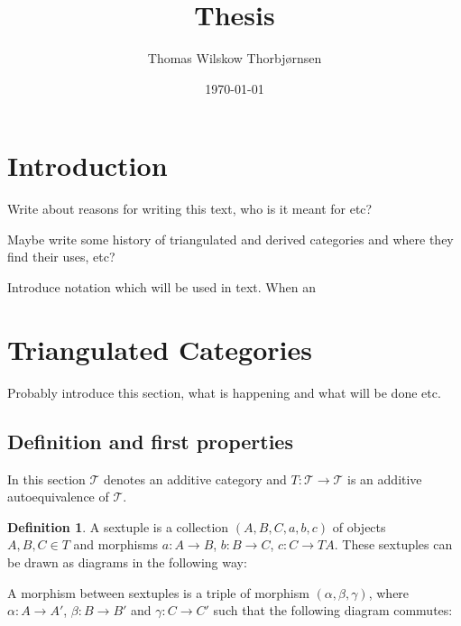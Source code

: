 \documentclass[12pt]{article}
\title{Thesis}
\author{Thomas Wilskow Thorbjørnsen}
\date{\today}
\theoremstyle{definition}
\newtheorem{definition}{Definition}[section]
\theoremstyle{remark}
\begin{document}
    \maketitle
    \section{Introduction}
    
    Write about reasons for writing this text, who is it meant for etc?

    Maybe write some history of triangulated and derived categories and where they find their uses, etc?

    Introduce notation which will be used in text.
    When an 
    \section{Triangulated Categories}
        Probably introduce this section, what is happening and what will be done etc.
        \subsection{Definition and first properties}
        In this section $\mathcal{T}$ denotes an additive category and $T:\mathcal{T}\rightarrow\mathcal{T}$ is an additive autoequivalence of $\mathcal{T}$.
        \begin{definition}
            A sextuple is a collection $(A,B,C,a,b,c)$ of objects \\ $A,B,C\in T$ and morphisms $a:A\rightarrow B$, $b:B\rightarrow C$, $c:C\rightarrow TA$. These sextuples can be drawn as diagrams in the following way:

            \begin{center}
            \end{center}

            A morphism between sextuples is a triple of morphism $(\alpha, \beta, \gamma)$, where $\alpha : A \rightarrow A'$, $\beta : B \rightarrow B'$ and $\gamma : C \rightarrow C'$ such that the following diagram commutes:

        \begin{center}
        \end{center}

        \end{definition}
\end{document}
